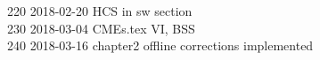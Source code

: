\begin{footnotesize}
220	2018-02-20	HCS in sw section\\
230	2018-03-04	CMEs.tex VI, BSS\\
240	2018-03-16	chapter2 offline corrections implemented\\

\end{footnotesize}
